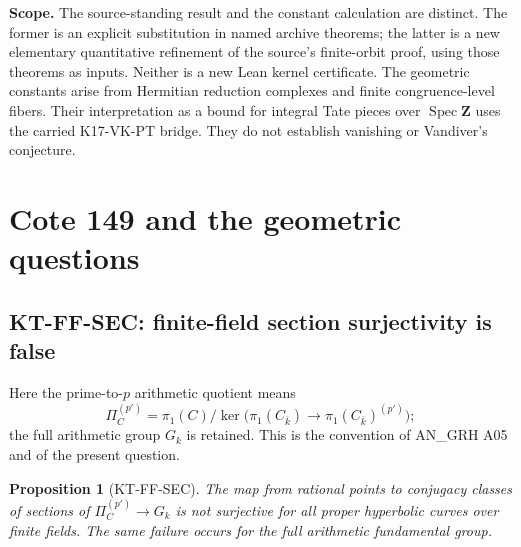\documentclass[11pt,a4paper]{article}
\newtheorem{proposition}[theorem]{Proposition}
\theoremstyle{definition}
\renewcommand{\paragraph}[1]{\par\smallskip\noindent\textbf{#1}\quad\ignorespaces}
\begin{document}
\paragraph{Scope.}
The source-standing result and the constant calculation are distinct.
The former is an explicit substitution in named archive theorems;
the latter is a new elementary quantitative refinement of the source's
finite-orbit proof, using those theorems as inputs.  Neither is a new
Lean kernel certificate.  The geometric constants arise from
Hermitian reduction complexes and finite congruence-level fibers.
Their interpretation as a bound for integral Tate pieces over
$\operatorname{Spec}\mathbf Z$ uses the carried K17-VK-PT bridge.
They do not establish vanishing or Vandiver's conjecture.


\section{Cote 149 and the geometric questions}

\subsection{KT-FF-SEC: finite-field section surjectivity is false}
\label{sec:kt-ff-sec}

Here the prime-to-$p$ arithmetic quotient means
\[
 \Pi_C^{(p')}=\pi_1(C)/
 \ker\bigl(\pi_1(C_{\overline k})\longrightarrow
                   \pi_1(C_{\overline k})^{(p')}\bigr);
\]
the full arithmetic group $G_k$ is retained. This is the convention
of AN\_GRH A05 and of the present question.

\begin{proposition}[KT-FF-SEC]
The map from rational points to conjugacy classes of sections of
$\Pi_C^{(p')}\to G_k$ is not surjective for all proper hyperbolic
curves over finite fields. The same failure occurs for the full
arithmetic fundamental group.
\end{proposition}
\end{document}

